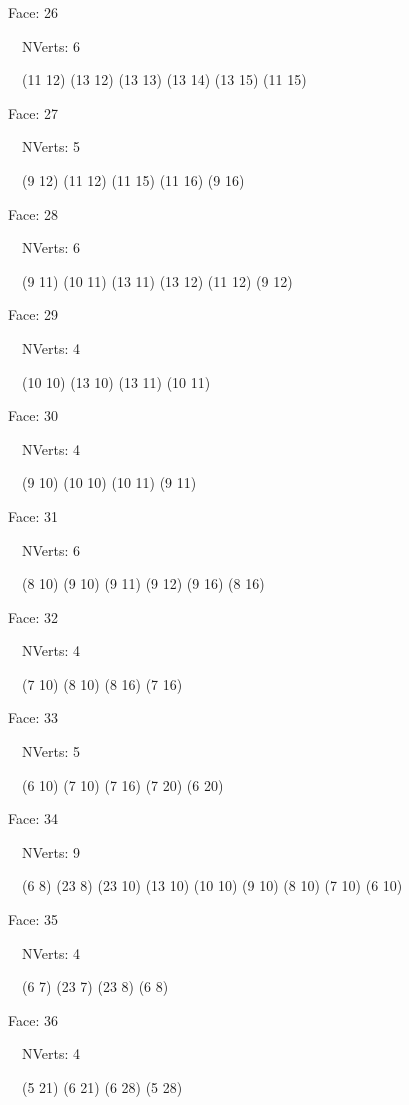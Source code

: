 \documentclass{article}
\begin{document}
{\footnotesize 

Face: 26

\   \    NVerts: 6

 \   \   (11 12) (13 12) (13 13) (13 14) (13 15) (11 15)}

{\footnotesize 

Face: 27

\   \    NVerts: 5

 \   \   (9 12) (11 12) (11 15) (11 16) (9 16)}

{\footnotesize 

Face: 28

\   \    NVerts: 6

 \   \   (9 11) (10 11) (13 11) (13 12) (11 12) (9 12)}

{\footnotesize 

Face: 29

\   \    NVerts: 4

 \   \   (10 10) (13 10) (13 11) (10 11)}

{\footnotesize 

Face: 30

\   \    NVerts: 4

 \   \   (9 10) (10 10) (10 11) (9 11)}

{\footnotesize 

Face: 31

\   \    NVerts: 6

 \   \   (8 10) (9 10) (9 11) (9 12) (9 16) (8 16)}

{\footnotesize 

Face: 32

\   \    NVerts: 4

 \   \   (7 10) (8 10) (8 16) (7 16)}

{\footnotesize 

Face: 33

\   \    NVerts: 5

 \   \   (6 10) (7 10) (7 16) (7 20) (6 20)}

{\footnotesize 

Face: 34

\   \    NVerts: 9

 \   \   (6 8) (23 8) (23 10) (13 10) (10 10) (9 10) (8 10) (7 10) (6 10)}

{\footnotesize 

Face: 35

\   \    NVerts: 4

 \   \   (6 7) (23 7) (23 8) (6 8)}

{\footnotesize 

Face: 36

\   \    NVerts: 4

 \   \   (5 21) (6 21) (6 28) (5 28)}
\end{document}
